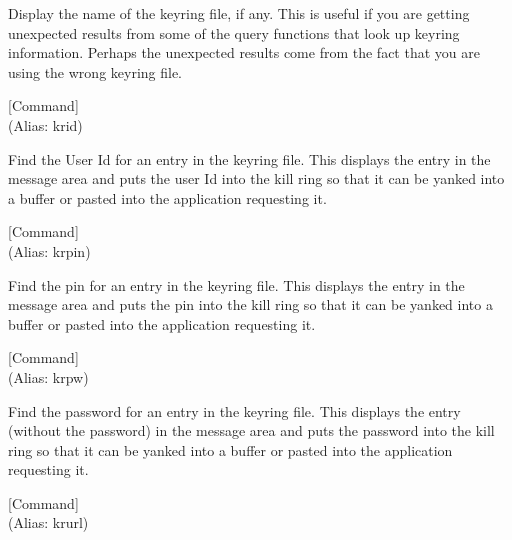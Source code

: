 \begin{doc-string}
Display the name of the keyring file, if any.  This is useful if you are
getting unexpected results from some of the query functions that look up keyring
information.  Perhaps the unexpected results come from the fact that you are
using the wrong keyring file.
\end{doc-string}

\vspace{1em}
\noindent
{}
\usebox{\funcname}
 \hfill [Command]\\%
 (Alias: krid)

\begin{doc-string}
Find the User Id for an entry in the keyring file.  This displays the entry
in the message area and puts the user Id into the kill ring so that it can be
yanked into a buffer or pasted into the application requesting it.
\end{doc-string}

\vspace{1em}
\noindent
{}
\usebox{\funcname}
 \hfill [Command]\\%
 (Alias: krpin)

\begin{doc-string}
Find the pin for an entry in the keyring file.  This displays the entry in
the message area and puts the pin into the kill ring so that it can be yanked
into a buffer or pasted into the application requesting it.
\end{doc-string}

\vspace{1em}
\noindent
{}
\usebox{\funcname}
 \hfill [Command]\\%
 (Alias: krpw)

\begin{doc-string}
Find the password for an entry in the keyring file.  This displays the entry
(without the password) in the message area and puts the password into the kill
ring so that it can be yanked into a buffer or pasted into the application
requesting it.
\end{doc-string}

\vspace{1em}
\noindent
{}
\usebox{\funcname}
 \hfill [Command]\\%
 (Alias: krurl)

